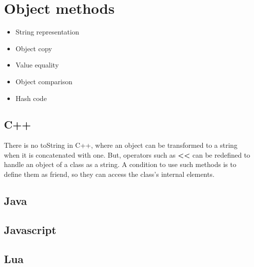 \documentclass{KodeBook}
\begin{document}





\section{Object methods}

\begin{itemize}
	\item String representation
	\item Object copy
	\item Value equality
	\item Object comparison
	\item Hash code
\end{itemize}


\subsection{C++}

There is no toString in C++, where an object can be transformed to a string when it is concatenated with one. 
But, operators such as \textbf{<<} can be redefined to handle an object of a class as a string. 
A condition to use such methods is to define them as friend, so they can access the class's internal elements.  



\subsection{Java}





\subsection{Javascript}



\subsection{Lua}
\end{document}
